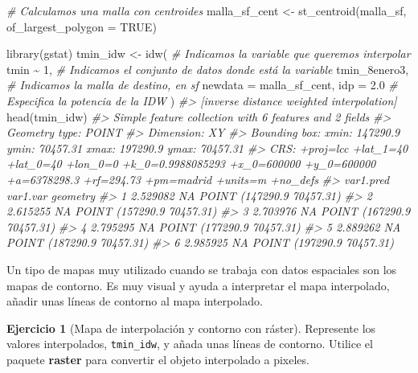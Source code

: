 \documentclass[
]{book}
\newenvironment{Shaded}{\begin{snugshade}}{\end{snugshade}}
\newcommand{\AttributeTok}[1]{\textcolor[rgb]{0.77,0.63,0.00}{#1}}
\newcommand{\CommentTok}[1]{\textcolor[rgb]{0.56,0.35,0.01}{\textit{#1}}}
\newcommand{\ConstantTok}[1]{\textcolor[rgb]{0.00,0.00,0.00}{#1}}
\newcommand{\DecValTok}[1]{\textcolor[rgb]{0.00,0.00,0.81}{#1}}
\newcommand{\FloatTok}[1]{\textcolor[rgb]{0.00,0.00,0.81}{#1}}
\newcommand{\FunctionTok}[1]{\textcolor[rgb]{0.00,0.00,0.00}{#1}}
\newcommand{\NormalTok}[1]{#1}
\newcommand{\OtherTok}[1]{\textcolor[rgb]{0.56,0.35,0.01}{#1}}
\newcommand{\SpecialCharTok}[1]{\textcolor[rgb]{0.00,0.00,0.00}{#1}}
\theoremstyle{definition}
\theoremstyle{definition}
\theoremstyle{definition}
\newtheorem{exercise}{Ejercicio}[chapter]
\theoremstyle{definition}
\theoremstyle{remark}
\begin{document}
\begin{Shaded}
\begin{Highlighting}[]
\CommentTok{\# Calculamos una malla con centroides}
\NormalTok{malla\_sf\_cent }\OtherTok{\textless{}{-}} \FunctionTok{st\_centroid}\NormalTok{(malla\_sf, }\AttributeTok{of\_largest\_polygon =} \ConstantTok{TRUE}\NormalTok{)}

\FunctionTok{library}\NormalTok{(gstat)}
\NormalTok{tmin\_idw }\OtherTok{\textless{}{-}} \FunctionTok{idw}\NormalTok{(}
  \CommentTok{\# Indicamos la variable que queremos interpolar}
\NormalTok{  tmin }\SpecialCharTok{\textasciitilde{}} \DecValTok{1}\NormalTok{,}
  \CommentTok{\# Indicamos el conjunto de datos donde está la variable}
\NormalTok{  tmin\_8enero3,}
  \CommentTok{\# Indicamos la malla de destino, en sf}
  \AttributeTok{newdata =}\NormalTok{ malla\_sf\_cent,}
  \AttributeTok{idp =} \FloatTok{2.0} \CommentTok{\# Especifica la potencia de la IDW}
\NormalTok{)}
\CommentTok{\#\textgreater{} [inverse distance weighted interpolation]}
\FunctionTok{head}\NormalTok{(tmin\_idw)}
\CommentTok{\#\textgreater{} Simple feature collection with 6 features and 2 fields}
\CommentTok{\#\textgreater{} Geometry type: POINT}
\CommentTok{\#\textgreater{} Dimension:     XY}
\CommentTok{\#\textgreater{} Bounding box:  xmin: 147290.9 ymin: 70457.31 xmax: 197290.9 ymax: 70457.31}
\CommentTok{\#\textgreater{} CRS:           +proj=lcc +lat\_1=40 +lat\_0=40 +lon\_0=0 +k\_0=0.9988085293 +x\_0=600000 +y\_0=600000 +a=6378298.3 +rf=294.73 +pm=madrid +units=m +no\_defs}
\CommentTok{\#\textgreater{}   var1.pred var1.var                  geometry}
\CommentTok{\#\textgreater{} 1  2.529082       NA POINT (147290.9 70457.31)}
\CommentTok{\#\textgreater{} 2  2.615255       NA POINT (157290.9 70457.31)}
\CommentTok{\#\textgreater{} 3  2.703976       NA POINT (167290.9 70457.31)}
\CommentTok{\#\textgreater{} 4  2.795295       NA POINT (177290.9 70457.31)}
\CommentTok{\#\textgreater{} 5  2.889262       NA POINT (187290.9 70457.31)}
\CommentTok{\#\textgreater{} 6  2.985925       NA POINT (197290.9 70457.31)}
\end{Highlighting}
\end{Shaded}

Un tipo de mapas muy utilizado cuando se trabaja con datos espaciales son los
mapas de contorno. Es muy visual y ayuda a interpretar el mapa interpolado,
añadir unas líneas de contorno al mapa interpolado.

\begin{exercise}[Mapa de interpolación y contorno con ráster]
\protect\hypertarget{exr:ex14}{}\label{exr:ex14}Represente los valores interpolados, \texttt{tmin\_idw}, y añada unas líneas de
contorno. Utilice el paquete \textbf{raster} para convertir el objeto interpolado a
pixeles.
\end{exercise}
\end{document}

